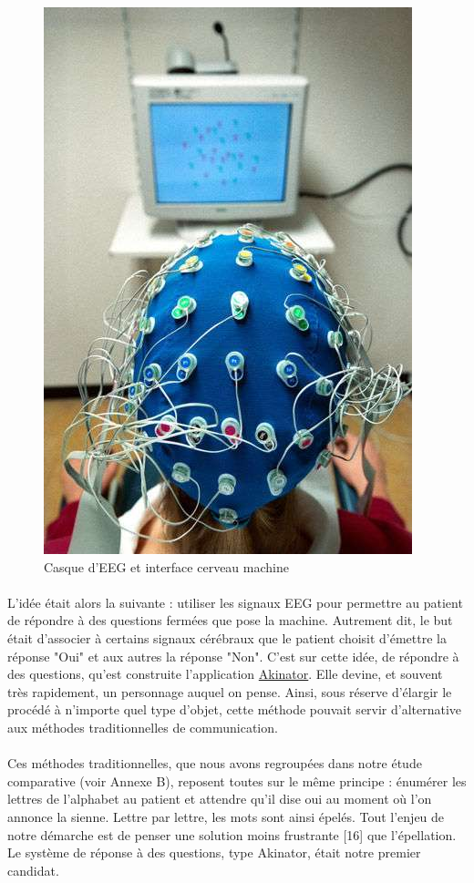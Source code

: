\documentclass[11pt,a4paper]{article}
\theoremstyle{plain}
\theoremstyle{definition}
\begin{document}
\begin{figure}[ht]
\centering
\includegraphics[scale=0.3]{images/electroencephalogramme.jpg}
\caption{Casque d'EEG et interface cerveau machine}
\label{eeg}
\end{figure}

\paragraph{} L'idée était alors la suivante : utiliser les signaux EEG pour permettre au patient de répondre à des questions fermées que pose la machine.
Autrement dit, le but était d'associer à certains signaux cérébraux que le patient choisit d'émettre la réponse "Oui" et aux autres la réponse "Non". 
C'est sur cette idée, de répondre à des questions, qu'est construite l'application \href{http://fr.akinator.com/}{Akinator}. Elle devine, et souvent très rapidement, 
un personnage auquel on pense. Ainsi, sous réserve d'élargir le procédé à n'importe quel type d'objet, cette méthode pouvait servir d'alternative aux méthodes traditionnelles de communication.

\paragraph{} Ces méthodes traditionnelles, que nous avons regroupées dans notre étude comparative (voir Annexe B), reposent toutes sur le même principe : énumérer les
lettres de l'alphabet au patient et attendre qu'il dise oui au moment où l'on annonce la sienne. Lettre par lettre, les mots sont ainsi épelés. Tout l'enjeu de notre démarche est de penser une solution moins frustrante [16] que l'épellation. Le système de réponse à des questions, type Akinator, était notre premier candidat.
\end{document}
